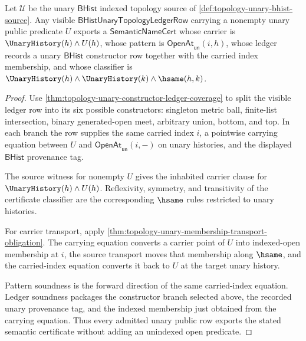 \begin{theorem}
\label{thm:topology-unary-bhist-public-certificate}
Let $\mathcal{U}$ be the unary $\mathsf{BHist}$ indexed topology source of \autoref{def:topology-unary-bhist-source}. Any visible $\mathsf{BHistUnaryTopologyLedgerRow}$ carrying a nonempty unary public predicate $U$ exports a $\mathsf{SemanticNameCert}$ whose carrier is $\UnaryHistory(h)\land U(h)$, whose pattern is $\mathsf{OpenAt}_{\mathsf{un}}(i,h)$, whose ledger records a unary $\mathsf{BHist}$ constructor row together with the carried index membership, and whose classifier is $\UnaryHistory(h)\land\UnaryHistory(k)\land\hsame(h,k)$.
\end{theorem}
\begin{proof}
Use \autoref{thm:topology-unary-constructor-ledger-coverage} to split the visible ledger row into its six possible constructors: singleton metric ball, finite-list intersection, binary generated-open meet, arbitrary union, bottom, and top. In each branch the row supplies the same carried index $i$, a pointwise carrying equation between $U$ and $\mathsf{OpenAt}_{\mathsf{un}}(i,-)$ on unary histories, and the displayed $\mathsf{BHist}$ provenance tag.

The source witness for nonempty $U$ gives the inhabited carrier clause for $\UnaryHistory(h)\land U(h)$. Reflexivity, symmetry, and transitivity of the certificate classifier are the corresponding $\hsame$ rules restricted to unary histories.

For carrier transport, apply \autoref{thm:topology-unary-membership-transport-obligation}. The carrying equation converts a carrier point of $U$ into indexed-open membership at $i$, the source transport moves that membership along $\hsame$, and the carried-index equation converts it back to $U$ at the target unary history.

Pattern soundness is the forward direction of the same carried-index equation. Ledger soundness packages the constructor branch selected above, the recorded unary provenance tag, and the indexed membership just obtained from the carrying equation. Thus every admitted unary public row exports the stated semantic certificate without adding an unindexed open predicate.
\end{proof}

